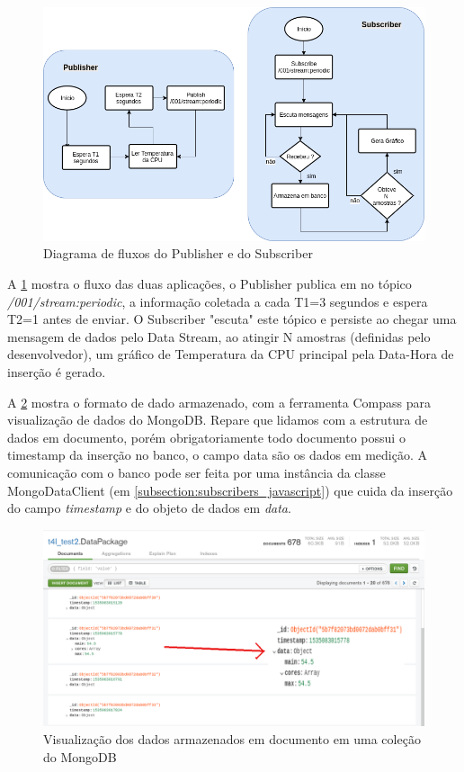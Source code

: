 \begin{figure}[h!]
\centering
\includegraphics[width=13cm]{./02_Capitulos/02_Cap4/figures/fluxo_controle_temp}
\caption{Diagrama de fluxos do Publisher e do Subscriber}
\label{fig:4.1.0/fluxo_controle_temp}
\end{figure}

A \ref{fig:4.1.0/fluxo_controle_temp} mostra o fluxo das duas aplicações, o Publisher publica em no tópico \textit{/001/stream:periodic}, a informação coletada a cada T1=3 segundos e espera T2=1 antes de enviar. O Subscriber "escuta" este tópico e persiste ao chegar uma mensagem de dados pelo Data Stream, ao atingir N amostras (definidas pelo  desenvolvedor), um gráfico de Temperatura da CPU principal pela Data-Hora de inserção é gerado.


A \ref{fig:4.1.0/compass} mostra o formato de dado armazenado, com a ferramenta Compass para visualização de dados do MongoDB. Repare que lidamos com a estrutura de dados em documento, porém obrigatoriamente todo documento possui o timestamp da inserção no banco, o campo data são os dados em medição. A comunicação com o banco pode ser feita por uma instância da classe MongoDataClient (em \ref{subsection:subscribers_javascript}) que cuida da inserção do campo \textit{timestamp} e do objeto de dados em \textit{data}.

\begin{figure}[h!]
\centering
\includegraphics[width=15cm]{./02_Capitulos/02_Cap4/figures/compass}
\caption{Visualização dos dados armazenados em documento em uma coleção do MongoDB}
\label{fig:4.1.0/compass}
\end{figure}

